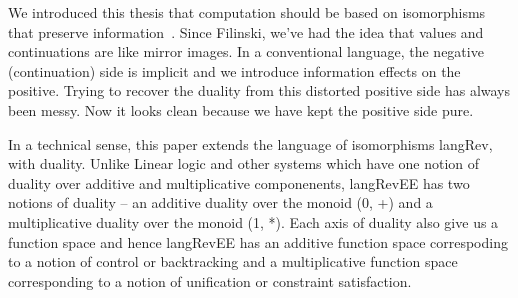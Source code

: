 \documentclass[preprint]{sigplanconf}
\begin{document}
We introduced this thesis that computation should be based on isomorphisms
that preserve information~\cite{infeffects}. Since Filinski, we've had the
idea that values and continuations are like mirror images. In a conventional
language, the negative (continuation) side is implicit and we introduce
information effects on the positive. Trying to recover the duality from this
distorted positive side has always been messy. Now it looks clean because we
have kept the positive side pure.








In a technical sense, this paper extends the language of isomorphisms
{{langRev}}, with duality. Unlike Linear logic \cite{Girard87tcs} and
other systems which have one notion of duality over additive and
multiplicative componenents, {{langRevEE}} has two notions of duality
-- an additive duality over the monoid {{(0, +)}} and a multiplicative
duality over the monoid {{(1, *)}}. Each axis of duality also give us
a function space and hence {{langRevEE}} has an additive function
space correspoding to a notion of control or backtracking and a
multiplicative function space corresponding to a notion of unification
or constraint satisfaction.
\end{document}
